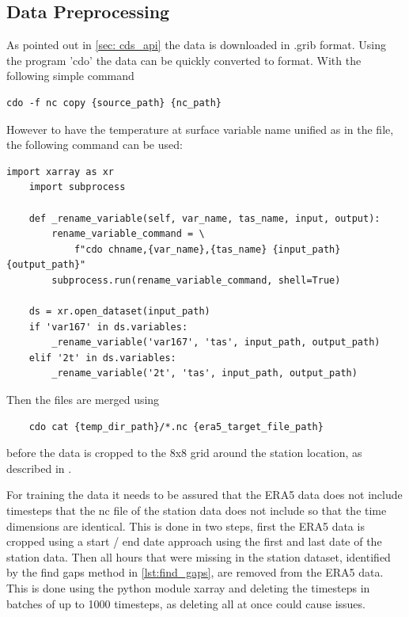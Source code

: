 \subsection{Data Preprocessing}

As pointed out in \autoref{sec: cds_api} the data is downloaded in .grib format. Using the program 'cdo' the data can be quickly converted to  format.
With the following simple command

\begin{lstlisting}
cdo -f nc copy {source_path} {nc_path}
\end{lstlisting}

However to have the temperature at surface variable name unified as  in the  file, the following command can be used:

\begin{lstlisting}[caption=Renaming Variable in \code{NetCDF} File, label=lst:rename_variable]
    import xarray as xr
    import subprocess

    def _rename_variable(self, var_name, tas_name, input, output):
        rename_variable_command = \
            f"cdo chname,{var_name},{tas_name} {input_path} {output_path}"
        subprocess.run(rename_variable_command, shell=True)
        
    ds = xr.open_dataset(input_path)
    if 'var167' in ds.variables:
        _rename_variable('var167', 'tas', input_path, output_path)
    elif '2t' in ds.variables:
        _rename_variable('2t', 'tas', input_path, output_path)

\end{lstlisting}

Then the files are merged using 

\begin{lstlisting}
    cdo cat {temp_dir_path}/*.nc {era5_target_file_path}
\end{lstlisting}

before the data is cropped to the 8x8 grid around the station location, as described in .

For training the data it needs to be assured that the ERA5 data does not include timesteps that the nc file of the station data does not include so that the time dimensions are identical.
This is done in two steps, first the ERA5 data is cropped using a start / end date approach using the first and last date of the station data.
Then all hours that were missing in the station dataset, identified by the find gaps method in \autoref{lst:find_gaps}, are removed from the ERA5 data.
This is done using the python module xarray and deleting the timesteps in batches of up to 1000 timesteps, as deleting all at once could cause issues.

